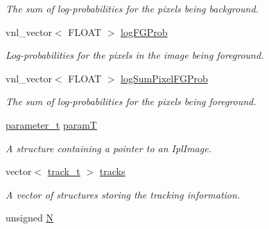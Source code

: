 \begin{DoxyCompactItemize}
\begin{DoxyCompactList}\small\item\em The sum of log-\/probabilities for the pixels being background. \item\end{DoxyCompactList}\item 
\hypertarget{classfindperson_a39e4b4bd141cd13605991d3c30976431}{
vnl\_\-vector$<$ FLOAT $>$ \hyperlink{classfindperson_a39e4b4bd141cd13605991d3c30976431}{logFGProb}}
\label{classfindperson_a39e4b4bd141cd13605991d3c30976431}

\begin{DoxyCompactList}\small\item\em Log-\/probabilities for the pixels in the image being foreground. \item\end{DoxyCompactList}\item 
\hypertarget{classfindperson_a5dba19cc173c5e14c312c82893407051}{
vnl\_\-vector$<$ FLOAT $>$ \hyperlink{classfindperson_a5dba19cc173c5e14c312c82893407051}{logSumPixelFGProb}}
\label{classfindperson_a5dba19cc173c5e14c312c82893407051}

\begin{DoxyCompactList}\small\item\em The sum of log-\/probabilities for the pixels being foreground. \item\end{DoxyCompactList}\item 
\hypertarget{classfindperson_af4f2a0cd670f95418534a9678456c2e3}{
\hyperlink{structparameter__t}{parameter\_\-t} \hyperlink{classfindperson_af4f2a0cd670f95418534a9678456c2e3}{paramT}}
\label{classfindperson_af4f2a0cd670f95418534a9678456c2e3}

\begin{DoxyCompactList}\small\item\em A structure containing a pointer to an {\ttfamily IplImage}. \item\end{DoxyCompactList}\item 
\hypertarget{classfindperson_a0fa099d5bc4bb08195c1d4b0cd2d3f00}{
vector$<$ \hyperlink{structtrack__t}{track\_\-t} $>$ \hyperlink{classfindperson_a0fa099d5bc4bb08195c1d4b0cd2d3f00}{tracks}}
\label{classfindperson_a0fa099d5bc4bb08195c1d4b0cd2d3f00}

\begin{DoxyCompactList}\small\item\em A vector of structures storing the tracking information. \item\end{DoxyCompactList}\item 
\hypertarget{classfindperson_a8cc2e7240164328fdc3f0e5e21032c56}{
unsigned \hyperlink{classfindperson_a8cc2e7240164328fdc3f0e5e21032c56}{N}}
\label{classfindperson_a8cc2e7240164328fdc3f0e5e21032c56}


\end{DoxyCompactItemize}
